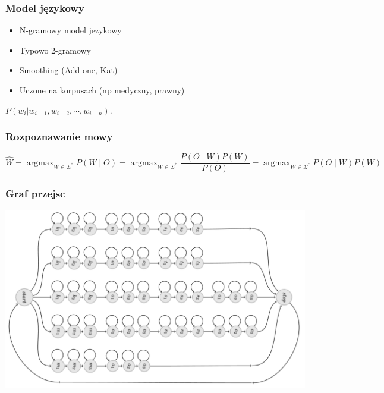 \documentclass[mathserif, serif]{beamer}
\DeclareMathOperator*{\argmax}{\arg\max}   %
\begin{document}
	\begin{frame}
		\frametitle{Model językowy}
		\footnotesize
		
		\begin{itemize}
			\item N-gramowy model jezykowy
			\item Typowo 2-gramowy
			\item Smoothing (Add-one, Kat)
			\item Uczone na korpusach (np medyczny, prawny)
		\end{itemize}
	
		\begin{center}
			$P(w_i|w_{i-1},w_{i-2},\cdots,w_{i-n})$.
		\end{center}
	\end{frame}

	\begin{frame}
		\frametitle{Rozpoznawanie mowy}
		\footnotesize
		
		\begin{equation}
			\hat{W}=\argmax_{W \in \Sigma^{*}}{P(W \mid O)} = \argmax_{W \in \Sigma^{*}}{\frac{P(O \mid W)P(W)}{P(O)}} = \argmax_{W \in \Sigma^{*}}{P(O \mid W)P(W)}
			\label{equation:ASR_definicja2}
		\end{equation}
	\end{frame}

	\begin{frame}
		\frametitle{Graf przejsc}
		\footnotesize
		
		\includegraphics[scale=0.4, trim=2cm 0 0 0cm]{tree1}
	\end{frame}
\end{document}
